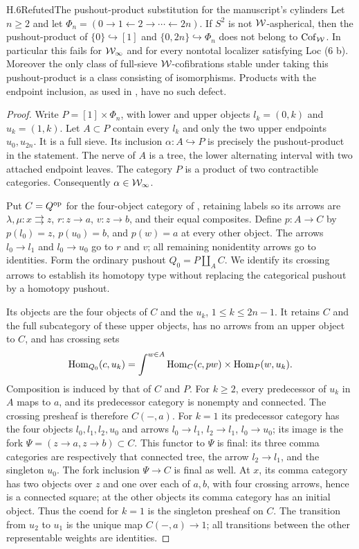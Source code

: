 \begin{claim}{H.6}{Refuted}{The pushout-product substitution for the manuscript's cylinders}
Let $n\geq2$ and let
$\Phi_n=(0\to1\leftarrow2\to\cdots\leftarrow2n)$.
If $S^2$ is not $\mathcal{W}$-aspherical, then the pushout-product of
$\{0\}\hookrightarrow[1]$ and $\{0,2n\}\hookrightarrow\Phi_n$
does not belong to $\operatorname{Cof}_{\mathcal{W}}$. In particular this fails for $\mathcal{W}_{\infty}$ and for every nontotal localizer satisfying Loc (6 b). Moreover the only class of full-sieve $\mathcal{W}$-cofibrations stable under taking this pushout-product is a class consisting of isomorphisms. Products with the endpoint inclusion, as used in , have no such defect.
\end{claim}
\begin{proof}
Write $P=[1]\times\Phi_n$, with lower and upper objects $l_k=(0,k)$ and $u_k=(1,k)$. Let $A\subset P$ contain every $l_k$ and only the two upper endpoints $u_0,u_{2n}$. It is a full sieve. Its inclusion $\alpha:A\hookrightarrow P$ is precisely the pushout-product in the statement. The nerve of $A$ is a tree, the lower alternating interval with two attached endpoint leaves. The category $P$ is a product of two contractible categories. Consequently $\alpha\in\mathcal{W}_{\infty}$.

Put $C=Q^{\mathrm{op}}$ for the four-object category of , retaining labels so its arrows are $\lambda,\mu:x\rightrightarrows z$, $r:z\to a$, $v:z\to b$, and their equal composites. Define $p:A\to C$ by $p(l_0)=z$, $p(u_0)=b$, and $p(w)=a$ at every other object. The arrows $l_0\to l_1$ and $l_0\to u_0$ go to $r$ and $v$; all remaining nonidentity arrows go to identities. Form the ordinary pushout $Q_0=P\amalg_A C$. We identify its crossing arrows to establish its homotopy type without replacing the categorical pushout by a homotopy pushout.

Its objects are the four objects of $C$ and the $u_k$, $1\leq k\leq2n-1$. It retains $C$ and the full subcategory of these upper objects, has no arrows from an upper object to $C$, and has crossing sets
\[
 \operatorname{Hom}_{Q_0}(c,u_k)
 =\int^{w\in A}\operatorname{Hom}_C(c,pw)\times\operatorname{Hom}_P(w,u_k).
\]
Composition is induced by that of $C$ and $P$. For $k\geq2$, every predecessor of $u_k$ in $A$ maps to $a$, and its predecessor category is nonempty and connected. The crossing presheaf is therefore $C(-,a)$. For $k=1$ its predecessor category has the four objects $l_0,l_1,l_2,u_0$ and arrows $l_0\to l_1$, $l_2\to l_1$, $l_0\to u_0$; its image is the fork $\Psi=(z\to a,z\to b)\subset C$. This functor to $\Psi$ is final: its three comma categories are respectively that connected tree, the arrow $l_2\to l_1$, and the singleton $u_0$. The fork inclusion $\Psi\to C$ is final as well. At $x$, its comma category has two objects over $z$ and one over each of $a,b$, with four crossing arrows, hence is a connected square; at the other objects its comma category has an initial object. Thus the coend for $k=1$ is the singleton presheaf on $C$. The transition from $u_2$ to $u_1$ is the unique map $C(-,a)\to1$; all transitions between the other representable weights are identities.


\end{proof}
